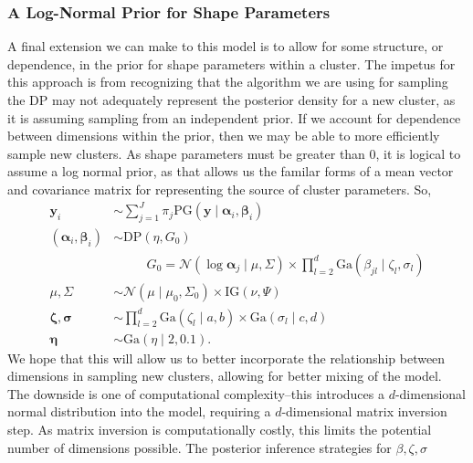 \subsubsection{A Log-Normal Prior for Shape Parameters}
A final extension we can make to this model is to allow for some structure, or dependence, in the prior
  for shape parameters within a cluster.  The impetus for this approach is from recognizing that the
  algorithm we are using for sampling the DP may not adequately represent the posterior density for
  a new cluster, as it is assuming sampling from an independent prior.  If we account for dependence
  between dimensions within the prior, then we may be able to more efficiently sample new clusters.
  As shape parameters must be greater than 0, it is logical to assume a log normal prior, as that
  allows us the familar forms of a mean vector and covariance matrix for representing the source of
  cluster parameters. So,
  \begin{equation}
    \label{eqn:dpln}
    \begin{aligned}
      \bm{ y}_i &\sim \sum_{j = 1}^J\pi_j\text{PG}\left(\bm{ y}\mid \bm{ \alpha}_i, \bm{\beta}_i\right)\\
      (\bm{\alpha}_i, \bm{\beta}_i) &\sim \text{DP}\left(\eta, G_0\right)\\
        &~\hspace{1cm}G_0 = \mathcal{N}\left(\log\bm{ \alpha}_{j}\mid\mu,\Sigma\right)\times
            {\textstyle\prod}_{l = 2}^d\text{Ga}\left(\beta_{jl}\mid\zeta_l,\sigma_l\right)\\
      \mu,\Sigma &\sim \mathcal{N}\left(\mu\mid\mu_0,\Sigma_0\right) \times \text{IG}\left(\nu,\Psi\right)\\
      \bm{ \zeta},\bm{\sigma} &\sim {\textstyle\prod}_{l = 2}^d\text{Ga}(\zeta_l \mid a,b) \times \text{Ga}(\sigma_l \mid c,d) \\
      \bm{ \eta} &\sim \text{Ga}(\eta \mid 2, 0.1).
    \end{aligned}
  \end{equation}
  We hope that this will allow us to better incorporate the relationship between dimensions in
  sampling new clusters, allowing for better mixing of the model.  The downside is one of computational
  complexity--this introduces a $d$-dimensional normal distribution into the model, requiring a
  $d$-dimensional matrix inversion step.  As matrix inversion is computationally costly, this limits
  the potential number of dimensions possible.  The posterior inference strategies for $\beta,\zeta,\sigma$
